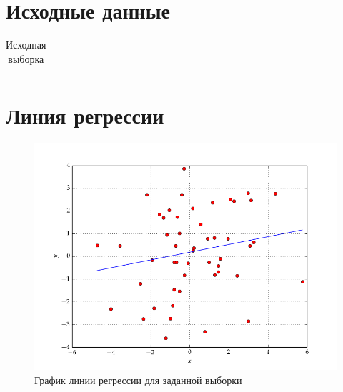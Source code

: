 \documentclass[a4paper,12pt]{report}
\begin{document}
\section*{Исходные данные}

\begin{table}[h!]
  \renewcommand{\tabcolsep}{0.9em}
  \centering
  \begin{tabular}{cccccccccc}
    
  \end{tabular}
  \caption{Исходная выборка}
\end{table}

\section*{Линия регрессии}

\begin{figure}[h!] 
  \centering
  \includegraphics[width=0.8\linewidth]{../pic/sample_regression}
  \caption{График линии регрессии для заданной выборки}
\end{figure}
\end{document}

